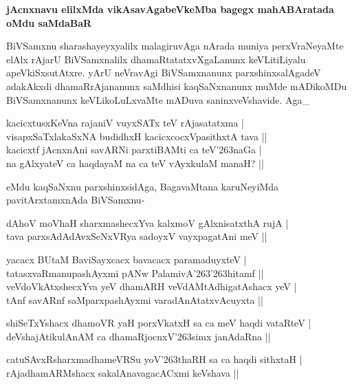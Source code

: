 {\bigskip
\noindent
{\large\bf jAcnxnavu elilxMda vikAsavAgabeVkeMba bagegx mahABAratada oMdu saMdaBaR}}\label{page162}
\medskip

\noindent
BiVSamxnu sharashayeyxyalilx malagiruvAga nArada muniya perxVraNeyaMte elAlx rAjarU BiVSamx\-nalilx dhamaRtatatxvXgaLanunx keVLitiLiyalu apeVkiSxsutAtxre. yArU neVravAgi BiVSamxnanunx parxshinxsalAgadeV adakAkxdi dhamaR\-rAja\-nanunx saMdhisi kaqSaNxnanunx muMde mADikoMDu BiVSamxnanunx keVLikoLuLxvaMte mADuva saninxveVshavide. Aga\_

\begin{shloka}
kacicxtusxKeVna rajaniV vuyxSATx teV rAjasatatxma |\\\label{162}
visapxSaTxlakaSxNA budidhxH kacicxcocxVpasithxtA tava ||\\
kacicxtf jAcnxnAni savARNi parxtiBAMti ca teV\char'263naGa |\\
na gAlxyateV ca haqdayaM na ca teV vAyxkulaM manaH? ||
\end{shloka} 

\noindent
eMdu kaqSaNxnu parxshinxsidAga, BagavaMtana karuNeyiMda pavitArxtamxnAda BiVSamxnu-

\begin{shloka}
dAhoV moVhaH sharxmashecxYva kalxmoV gAlxnisatxthA rujA |\\
tava parxsAdAdAvxSeNxVRya sadoyxV vayxpagatAni meV ||
\end{shloka}

\begin{shloka}
yacacx BUtaM BaviSayxcacx bavacacx paramaduyxteV |\\
tatasxvaRmanupashAyxmi pANw PalamivA\char'263\char'263hitamf ||\\
veVdoVkAtxshecxYva yeV dhamARH veVdAMtAdhigatAshacx yeV |\\
tAnf savARnf saMparxpashAyxmi varadAnAtatxvAcuyxta ||
\end{shloka}

\begin{shloka}
shiSeTxYshacx dhamoVR yaH porxVkatxH sa ca meV haqdi vataRteV |\\
deVshajAtikulAnAM ca dhamaRjocnxV\char'263simx janAdaRna ||
\end{shloka}

\begin{shloka}
catuSAvxRsharxmadhameVRSu yoV\char'263thaRH sa ca haqdi sithxtaH |\\
rAjadhamARMshacx sakalAnavagacACxmi keVshava ||
\end{shloka}

